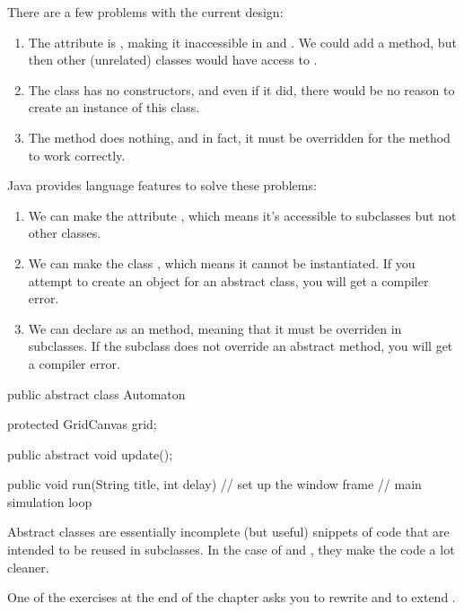 There are a few problems with the current design:
\begin{enumerate}
\item The  attribute is , making it inaccessible in  and .
We could add a  method, but then other (unrelated) classes would have access to .
\item The  class has no constructors, and even if it did, there would be no reason to create an instance of this class.
\item The  method does nothing, and in fact, it must be overridden for the  method to work correctly.
\end{enumerate}


Java provides language features to solve these problems:
\begin{enumerate}
\item We can make the  attribute , which means it's accessible to subclasses but not other classes.
\item We can make the class , which means it cannot be instantiated.
If you attempt to create an object for an abstract class, you will get a compiler error.
\item We can declare  as an  method, meaning that it must be overriden in subclasses.
If the subclass does not override an abstract method, you will get a compiler error.
\end{enumerate}

\begin{code}
public abstract class Automaton {
    protected GridCanvas grid;

    public abstract void update();

    public void run(String title, int delay) {
        // set up the window frame
        // main simulation loop
    }
}
\end{code}

Abstract classes are essentially incomplete (but useful) snippets of code that are intended to be reused in subclasses.
In the case of  and , they make the code a lot cleaner.

One of the exercises at the end of the chapter asks you to rewrite  and  to extend .


